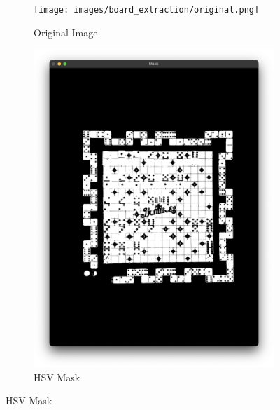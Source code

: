 \documentclass[12pt]{article}
\begin{document}
    \begin{figure}[!h]
        \centering
        \caption{Board Extraction Steps}
        \label{fig:board-extraction-steps}
        \begin{subfigure}{.5\textwidth}
            \centering
            \texttt{[image: images/board\_extraction/original.png]}
            \caption{Original Image}
            \label{fig:be-original}
        \end{subfigure}%
        \begin{subfigure}{.5\textwidth}
            \centering
            \includegraphics[width=0.8\linewidth]
            {images/board_extraction/mask.png}
            \caption{HSV Mask}
            \label{fig:be-mask}
        \end{subfigure}
    \end{figure}
\end{document}
